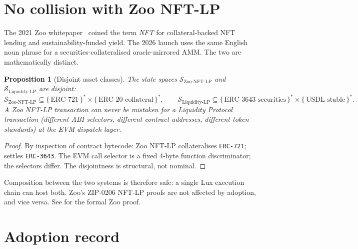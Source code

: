 \documentclass[11pt]{article}
\newtheorem{proposition}[theorem]{Proposition}
\begin{document}
\section{No collision with Zoo NFT-LP}
\label{sec:no-collide}

The 2021 Zoo whitepaper~\cite{zoo-2021} coined the term
\emph{NFT } for collateral-backed NFT lending and
sustainability-funded yield.  The 2026  launch uses the
same English noun phrase for a securities-collateralised
oracle-mirrored AMM.  The two are mathematically distinct.

\begin{proposition}[Disjoint asset classes]
\label{prop:disjoint}
The state spaces $\mathcal{S}_{\mathrm{Zoo\text{-}NFT\text{-}LP}}$
and $\mathcal{S}_{\mathrm{Liquidity\text{-}LP}}$ are disjoint:
\[
  \mathcal{S}_{\mathrm{Zoo\text{-}NFT\text{-}LP}}
  \subseteq \{\,\text{ERC-721}\,\}^* \times
            \{\,\text{ERC-20 collateral}\,\}^*,
  \qquad
  \mathcal{S}_{\mathrm{Liquidity\text{-}LP}}
  \subseteq \{\,\text{ERC-3643 securities}\,\}^* \times
            \{\,\text{USDL stable}\,\}^*.
\]
A Zoo NFT-LP transaction can never be mistaken for a Liquidity
Protocol transaction (different ABI selectors, different contract
addresses, different token standards) at the EVM dispatch layer.
\end{proposition}

\begin{proof}
By inspection of contract bytecode: Zoo NFT-LP collateralises
\texttt{ERC-721};  settles \texttt{ERC-3643}.  The
EVM call selector is a fixed 4-byte function discriminator; the
selectors differ.  The disjointness is structural, not nominal.
\end{proof}

Composition between the two systems is therefore safe: a single Lux
execution chain can host both.  Zoo's ZIP-0206 NFT-LP proofs are not
affected by  adoption, and vice versa.  See
\cite{zoo-nft-lp} for the formal Zoo proof.

\section{Adoption record}
\label{sec:record}
\end{document}
